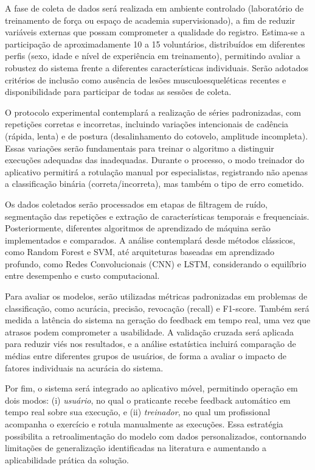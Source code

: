 A fase de coleta de dados será realizada em ambiente controlado (laboratório de treinamento de força ou espaço de academia supervisionado), a fim de reduzir variáveis externas que possam comprometer a qualidade do registro. Estima-se a participação de aproximadamente 10 a 15 voluntários, distribuídos em diferentes perfis (sexo, idade e nível de experiência em treinamento), permitindo avaliar a robustez do sistema frente a diferentes características individuais. Serão adotados critérios de inclusão como ausência de lesões musculoesqueléticas recentes e disponibilidade para participar de todas as sessões de coleta. 

O protocolo experimental contemplará a realização de séries padronizadas, com repetições corretas e incorretas, incluindo variações intencionais de cadência (rápida, lenta) e de postura (desalinhamento do cotovelo, amplitude incompleta). Essas variações serão fundamentais para treinar o algoritmo a distinguir execuções adequadas das inadequadas. Durante o processo, o modo treinador do aplicativo permitirá a rotulação manual por especialistas, registrando não apenas a classificação binária (correta/incorreta), mas também o tipo de erro cometido.  

Os dados coletados serão processados em etapas de filtragem de ruído, segmentação das repetições e extração de características temporais e frequenciais. Posteriormente, diferentes algoritmos de aprendizado de máquina serão implementados e comparados. A análise contemplará desde métodos clássicos, como Random Forest e SVM, até arquiteturas baseadas em aprendizado profundo, como Redes Convolucionais (CNN) e LSTM, considerando o equilíbrio entre desempenho e custo computacional.  

Para avaliar os modelos, serão utilizadas métricas padronizadas em problemas de classificação, como acurácia, precisão, revocação (recall) e F1-score. Também será medida a latência do sistema na geração do feedback em tempo real, uma vez que atrasos podem comprometer a usabilidade. A validação cruzada será aplicada para reduzir viés nos resultados, e a análise estatística incluirá comparação de médias entre diferentes grupos de usuários, de forma a avaliar o impacto de fatores individuais na acurácia do sistema.  

Por fim, o sistema será integrado ao aplicativo móvel, permitindo operação em dois modos: (i) \textit{usuário}, no qual o praticante recebe feedback automático em tempo real sobre sua execução, e (ii) \textit{treinador}, no qual um profissional acompanha o exercício e rotula manualmente as execuções. Essa estratégia possibilita a retroalimentação do modelo com dados personalizados, contornando limitações de generalização identificadas na literatura e aumentando a aplicabilidade prática da solução.


